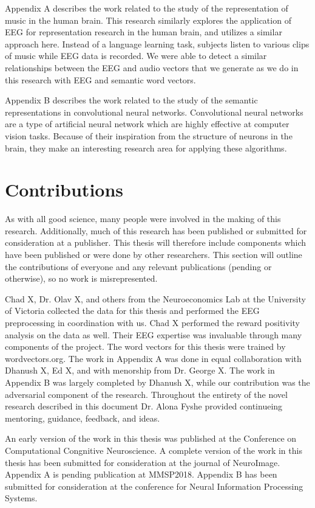 Appendix A describes the work related to the study of the representation of 
music in the human brain. This research similarly explores the application of 
EEG for representation research in the human brain, and utilizes a similar 
approach here. Instead of a language learning task, subjects listen to various 
clips of music while EEG data is recorded. We were able to detect a similar 
relationships between the EEG and audio vectors that we generate as we do in 
this research with EEG and semantic word vectors.

Appendix B describes the work related to the study of the semantic 
representations in convolutional neural networks. Convolutional neural networks 
are a type of artificial neural network which are highly effective at computer 
vision tasks. Because of their inspiration from the structure of neurons in the 
brain, they make an interesting research area for applying these algorithms. 

\section{Contributions}

As with all good science, many people were involved in the making of this 
research. Additionally, much of this research has been published or submitted 
for consideration at a publisher. This thesis will therefore include components 
which have been published or were done by other researchers. This section will 
outline the contributions of everyone and any relevant publications (pending or 
otherwise), so no work is misrepresented.

Chad X, Dr. Olav X, and others from the Neuroeconomics Lab at the University of 
Victoria collected the data for this thesis and performed the EEG preprocessing 
in coordination with us. Chad X performed the reward positivity analysis on the 
data as well. Their EEG expertise was invaluable through many components of the 
project. The word vectors for this thesis were trained by wordvectors.org. The 
work in Appendix A was done in equal collaboration with Dhanush X, Ed X, and 
with menorship from Dr. George X. The work in Appendix B was largely completed 
by Dhanush X, while our contribution was the adversarial component of the 
research. Throughout the entirety of the novel research described in this 
document Dr. Alona Fyshe provided continueing mentoring, guidance, feedback, 
and ideas.

An early version of the work in this thesis was published at the Conference on 
Computational Congnitive Neuroscience. A complete version of the work in this 
thesis has been submitted for consideration at the journal of NeuroImage.  
Appendix A is pending publication at MMSP2018. Appendix B has been submitted 
for consideration at the conference for Neural Information Processing Systems.

